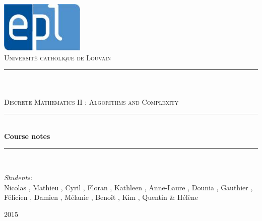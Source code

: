 \newcommand{\HRule}{\rule{\linewidth}{0.5mm}}

\begin{titlepage}
	
\begin{center}

\includegraphics[width=0.30\textwidth]{images/epl.jpg}\\[1cm]    

\textsc{\LARGE Universit\'e catholique de Louvain}\\[1.5cm]

\HRule \\[0.5cm]

\textsc{\Large {}}\\[0.2cm]
\textsc{\Large Discrete Mathematics II : Algorithms and Complexity}\\[0.5cm]


\HRule \\[2cm]
{\huge \bfseries Course notes}\\[1cm]

\HRule \\[1.5cm]

\begin{minipage}{0.8\textwidth}
\begin{flushleft} \large
\emph{Students:}\\
Nicolas , Mathieu , Cyril , Floran , Kathleen , Anne-Laure , Dounia , Gauthier , Félicien , Damien , M\'elanie , Beno\^it , Kim , Quentin   \& H\'el\`ene 


\end{flushleft}
\end{minipage}


\vfill

{\large  2015}

\end{center}	
	
	
\end{titlepage}
